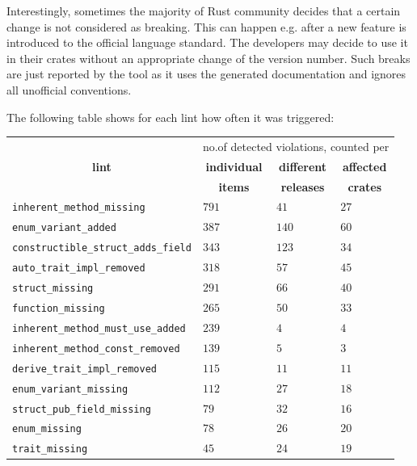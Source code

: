 \documentclass[licencjacka,en]{pracamgr}
\newcommand\Tspace{\rule{0pt}{2.6ex}}         %
\begin{document}
Interestingly, sometimes the majority of Rust community decides that a certain change is not
considered as breaking. This can happen e.g. after a new feature is introduced to the official
language standard. The developers may decide to use it in their crates without an appropriate change
of the version number. Such breaks are just reported by the tool as it uses the generated
documentation and ignores all unofficial conventions.

The following table shows for each lint how often it was triggered:

\begin{center}
	\begin{longtable}{| p{7.75cm} | p{1.975cm} | p{1.975cm} | p{1.975cm} |}
		\hline
			&
			\multicolumn{3}{c|}{no.\:of detected violations, counted per} \\
		\cline{2-4}
			\multicolumn{1}{|c|}{\textbf{lint}} &
			\multicolumn{1}{c|}{\textbf{individual}} &
			\multicolumn{1}{c|}{\textbf{different}} &
			\multicolumn{1}{c|}{\textbf{affected}} \Tspace \\
			&
			\multicolumn{1}{c|}{\textbf{items}} &
			\multicolumn{1}{c|}{\textbf{releases}} &
			\multicolumn{1}{c|}{\textbf{crates}} \\
		\hline
			\texttt{inherent\_method\_missing} & $791$ & $41$ & $27$ \Tspace \\
			\texttt{enum\_variant\_added} & $387$ & $140$ & $60$ \\
			\texttt{constructible\_struct\_adds\_field} & $343$ & $123$ & $34$ \\
			\texttt{auto\_trait\_impl\_removed} & $318$ & $57$ & $45$ \\
			\texttt{struct\_missing} & $291$ & $66$ & $40$ \\
			\texttt{function\_missing} & $265$ & $50$ & $33$ \\
			\texttt{inherent\_method\_must\_use\_added} & $239$ & $4$ & $4$ \\
			\texttt{inherent\_method\_const\_removed} & $139$ & $5$ & $3$ \\
			\texttt{derive\_trait\_impl\_removed} & $115$ & $11$ & $11$ \\
			\texttt{enum\_variant\_missing} & $112$ & $27$ & $18$ \\
			\texttt{struct\_pub\_field\_missing} & $79$ & $32$ & $16$ \\
			\texttt{enum\_missing} & $78$ & $26$ & $20$ \\
			\texttt{trait\_missing} & $45$ & $24$ & $19$ \\

\end{longtable}
\end{center}
\end{document}
